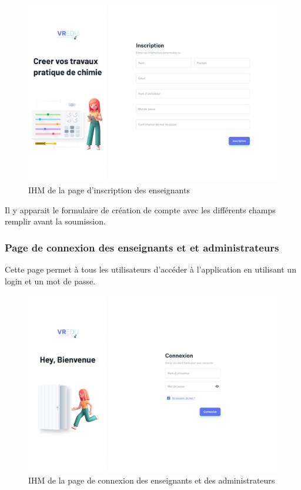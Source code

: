 \begin{figure}[H]
	\centering
	\includegraphics[width=1\textwidth]{img/insc}
	\caption{IHM de la page d'inscription des enseignants}
	\label{fig:mesh1}
\end{figure}

Il y apparait le formulaire de création de compte avec les différents champs remplir avant la soumission.

\subsubsection{Page de connexion des enseignants et et administrateurs}

Cette page permet à tous les utilisateurs d’accéder à l’application en utilisant un login et
un mot de passe.

\begin{figure}[H]
	\centering
	\includegraphics[width=1\textwidth]{img/conn}
	\caption{IHM de la page de connexion des enseignants et des administrateurs}
	\label{fig:mesh1}
\end{figure}

